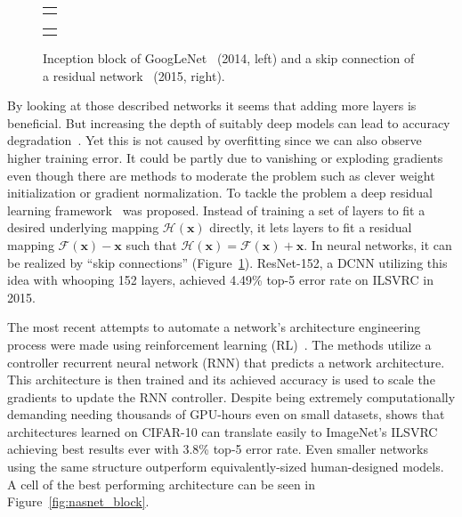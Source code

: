 \begin{figure}
	\centering
	
	\begin{tabular}{@{}c@{}}
		\subfloat{
			
		}
	\end{tabular}
	\qquad\qquad
	\begin{tabular}{@{}c@{}}
		\subfloat{
			
		}
	\end{tabular}
	
	\caption[Various advanced DCNN architectures]{Inception block of GoogLeNet~\cite{szegedy2015going} (2014, left) and a skip connection of a residual network~\cite{he2016deep} (2015, right).}
	\label{fig:inception_block}
\end{figure}

By looking at those described networks it seems that adding more layers is beneficial. But increasing the depth of suitably deep models can lead to accuracy degradation~\cite{he2016deep}. Yet this is not caused by overfitting since we can also observe higher training error. It could be partly due to vanishing or exploding gradients even though there are methods to moderate the problem such as clever weight initialization or gradient normalization. To tackle the problem a deep residual learning framework~\cite{he2016deep} was proposed. Instead of training a set of layers to fit a desired underlying mapping $\mathcal{H}(\bm{x})$ directly, it lets layers to fit a residual mapping $\mathcal{F}(\bm{x})-\bm{x}$ such that $\mathcal{H}(\bm{x}) = \mathcal{F}(\bm{x})+\bm{x}$. In neural networks, it can be realized by ``skip connections'' (Figure~\ref{fig:inception_block}). ResNet-152, a DCNN utilizing this idea  with whooping 152 layers, achieved 4.49\% top-5 error rate on ILSVRC in 2015.

The most recent attempts to automate a network's architecture engineering process were made using reinforcement learning (RL)~\cite{zoph2016neural,zoph2017learning}. The methods utilize a controller recurrent neural network (RNN) that predicts a network architecture. This architecture is then trained and its achieved accuracy is used to scale the gradients to update the RNN controller. Despite being extremely computationally demanding needing thousands of GPU-hours even on small datasets, \cite{zoph2017learning} shows that architectures learned on CIFAR-10 can translate easily to ImageNet's ILSVRC achieving best results ever with 3.8\% top-5 error rate. Even smaller networks using the same structure outperform equivalently-sized human-designed models. A cell of the best performing architecture can be seen in Figure~\ref{fig:nasnet_block}.


